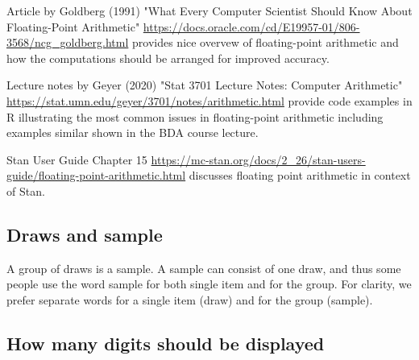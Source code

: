 \documentclass[a4paper,11pt,english]{article}
\begin{document}
Article by Goldberg (1991) "What Every Computer Scientist Should Know About Floating-Point Arithmetic" \url{https://docs.oracle.com/cd/E19957-01/806-3568/ncg_goldberg.html} provides nice overvew of floating-point arithmetic and how the computations should be arranged for improved accuracy.

Lecture notes by Geyer (2020) "Stat 3701 Lecture Notes: Computer Arithmetic" \url{https://stat.umn.edu/geyer/3701/notes/arithmetic.html} provide code examples in R illustrating the most common issues in floating-point arithmetic including examples similar shown in the BDA course lecture.

Stan User Guide Chapter 15 \url{https://mc-stan.org/docs/2_26/stan-users-guide/floating-point-arithmetic.html} discusses floating point arithmetic in context of Stan.

 \subsection*{Draws and sample}

 A group of draws is a sample. A sample can consist of one draw, and
 thus some people use the word sample for both single item and for the
 group. For clarity, we prefer separate words for a single item (draw)
 and for the group (sample).
 
  \subsection*{How many digits should be displayed}
\end{document}
